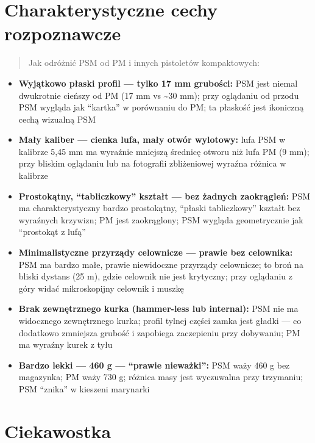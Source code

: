 \documentclass[12pt,openany,oneside]{book}
\providecommand{\tightlist}{%
  \setlength{\itemsep}{0pt}\setlength{\parskip}{0pt}}
\begin{document}
\section{Charakterystyczne cechy
rozpoznawcze}\label{charakterystyczne-cechy-rozpoznawcze-90}

\begin{quote}
Jak odróżnić PSM od PM i innych pistoletów kompaktowych:
\end{quote}

\begin{itemize}
\tightlist
\item
  \textbf{Wyjątkowo płaski profil --- tylko 17 mm grubości:} PSM jest
  niemal dwukrotnie cieńszy od PM (17 mm vs \textasciitilde30 mm); przy
  oglądaniu od przodu PSM wygląda jak ``kartka'' w porównaniu do PM; ta
  płaskość jest ikoniczną cechą wizualną PSM
\item
  \textbf{Mały kaliber --- cienka lufa, mały otwór wylotowy:} lufa PSM w
  kalibrze 5,45 mm ma wyraźnie mniejszą średnicę otworu niż lufa PM (9
  mm); przy bliskim oglądaniu lub na fotografii zbliżeniowej wyraźna
  różnica w kalibrze
\item
  \textbf{Prostokątny, ``tabliczkowy'' kształt --- bez żadnych
  zaokrągleń:} PSM ma charakterystyczny bardzo prostokątny, ``płaski
  tabliczkowy'' kształt bez wyraźnych krzywizn; PM jest zaokrąglony; PSM
  wygląda geometrycznie jak ``prostokąt z lufą''
\item
  \textbf{Minimalistyczne przyrządy celownicze --- prawie bez
  celownika:} PSM ma bardzo małe, prawie niewidoczne przyrządy
  celownicze; to broń na bliski dystans (25 m), gdzie celownik nie jest
  krytyczny; przy oglądaniu z góry widać mikroskopijny celownik i muszkę
\item
  \textbf{Brak zewnętrznego kurka (hammer-less lub internal):} PSM nie
  ma widocznego zewnętrznego kurka; profil tylnej części zamka jest
  gładki --- co dodatkowo zmniejsza grubość i zapobiega zaczepieniu przy
  dobywaniu; PM ma wyraźny kurek z tyłu
\item
  \textbf{Bardzo lekki --- 460 g --- ``prawie nieważki'':} PSM waży 460
  g bez magazynka; PM waży 730 g; różnica masy jest wyczuwalna przy
  trzymaniu; PSM ``znika'' w kieszeni marynarki
\end{itemize}

\section{Ciekawostka}\label{ciekawostka-90}
\end{document}
